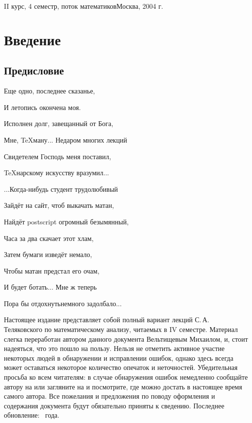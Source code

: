 \documentclass[a4paper]{article}
\begin{document}
{II курс, 4 семестр, поток математиков}{Москва, 2004 г.}
\pagebreak

\pagestyle{plain}
\tableofcontents
\pagebreak

\section*{Введение}

\subsection*{Предисловие}

{\scriptsize
{\itshape
{\hfill Еще одно, последнее сказанье,\par}
{\hfill И летопись окончена моя.\par}
{\hfill Исполнен долг, завещанный от Бога,\par}
{\hfill Мне, \TeX ману... Недаром многих лекций\par}
{\hfill Свидетелем Господь меня поставил,\par}
{\hfill \TeX нарскому искусству вразумил...\par}
\vskip 5pt
{\hfill ...Когда-нибудь студент трудолюбивый\par}
{\hfill Зайдёт на сайт, чтоб выкачать матан,\par}
{\hfill Найдёт postscript огромный безымянный,\par}
{\hfill Часа за два скачает этот хлам,\par}
{\hfill Затем бумаги изведёт немало,\par}
{\hfill Чтобы матан предстал его очам,\par}
{\hfill И будет ботать... Мне ж теперь\par}
{\hfill Пора бы отдохнуть\т немного задолбало...\par}
}}
\vskip 5pt

Настоящее издание представляет собой полный вариант лекций С.\,А.\,Теляковского по математическому
анализу, читаемых в IV семестре. Материал слегка переработан автором данного документа Вельтищевым
Михаилом, и, стоит надеяться, что это пошло на пользу. Нельзя не отметить активное участие некоторых людей
в обнаружении и исправлении ошибок, однако здесь всегда может оставаться некоторое количество
опечаток и неточностей. Убедительная просьба ко всем читателям: в случае обнаружения ошибок
немедленно сообщайте автору на \dmvnmail{} или загляните
на \dmvnwebsite{} и посмотрите, где можно достать в настоящее время
самого автора. Все пожелания и предложения по поводу оформления
и содержания документа будут обязательно приняты к сведению. Последнее обновление: ~года.
\end{document}
